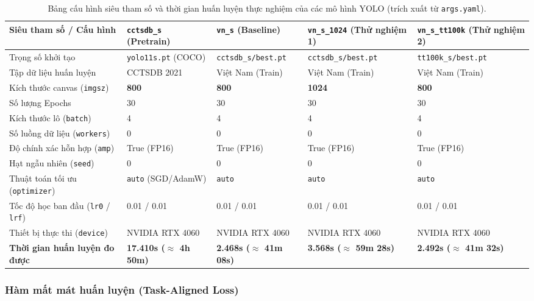 \documentclass[a4paper, 11pt]{article}
\begin{document}
\begin{table}[H]
\centering
\small
\caption{Bảng cấu hình siêu tham số và thời gian huấn luyện thực nghiệm của các mô hình YOLO (trích xuất từ \texttt{args.yaml}).}
\label{tab:yolo_training_configs}
\begin{tabularx}{\textwidth}{|p{3.8cm}|p{2.8cm}|p{2.8cm}|p{2.8cm}|Y|}
\hline
\textbf{Siêu tham số / Cấu hình} & \textbf{\texttt{cctsdb\_s} (Pretrain)} & \textbf{\texttt{vn\_s} (Baseline)} & \textbf{\texttt{vn\_s\_1024} (Thử nghiệm 1)} & \textbf{\texttt{vn\_s\_tt100k} (Thử nghiệm 2)} \\
\hline
Trọng số khởi tạo & \texttt{yolo11s.pt} (COCO) & \texttt{cctsdb\_s/best.pt} & \texttt{cctsdb\_s/best.pt} & \texttt{tt100k\_s/best.pt} \\
\hline
Tập dữ liệu huấn luyện & CCTSDB 2021 & Việt Nam (Train) & Việt Nam (Train) & Việt Nam (Train) \\
\hline
Kích thước canvas (\texttt{imgsz}) & \textbf{800} & \textbf{800} & \textbf{1024} & \textbf{800} \\
\hline
Số lượng Epochs & 30 & 30 & 30 & 30 \\
\hline
Kích thước lô (\texttt{batch}) & 4 & 4 & 4 & 4 \\
\hline
Số luồng dữ liệu (\texttt{workers}) & 0 & 0 & 0 & 0 \\
\hline
Độ chính xác hỗn hợp (\texttt{amp}) & True (FP16) & True (FP16) & True (FP16) & True (FP16) \\
\hline
Hạt ngẫu nhiên (\texttt{seed}) & 0 & 0 & 0 & 0 \\
\hline
Thuật toán tối ưu (\texttt{optimizer}) & \texttt{auto} (SGD/AdamW) & \texttt{auto} & \texttt{auto} & \texttt{auto} \\
\hline
Tốc độ học ban đầu (\texttt{lr0} / \texttt{lrf}) & 0.01 / 0.01 & 0.01 / 0.01 & 0.01 / 0.01 & 0.01 / 0.01 \\
\hline
Thiết bị thực thi (\texttt{device}) & NVIDIA RTX 4060 & NVIDIA RTX 4060 & NVIDIA RTX 4060 & NVIDIA RTX 4060 \\
\hline
\textbf{Thời gian huấn luyện đo được} & \textbf{17.410s ($\approx$ 4h 50m)} & \textbf{2.468s ($\approx$ 41m 08s)} & \textbf{3.568s ($\approx$ 59m 28s)} & \textbf{2.492s ($\approx$ 41m 32s)} \\
\hline
\end{tabularx}
\end{table}

\subsubsection{Hàm mất mát huấn luyện (Task-Aligned Loss)}
\label{subsubsec:yolo_loss_formula}
\end{document}
